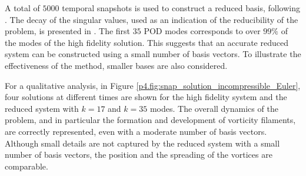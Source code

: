 A total of $5000$ temporal snapshots is used to construct a reduced basis, following . The decay of the singular values, used as an indication of the reducibility of the problem, is presented in . The first $35$ POD modes corresponds to over $99\%$ of the modes of the high fidelity solution. This suggests that an accurate reduced system can be constructed using a small number of basis vectors. To illustrate the effectiveness of the method, smaller bases are also considered.

For a qualitative analysis, in Figure \ref{p4.fig:snap_solution_incompressible_Euler}, four solutions at different times are shown for the high fidelity system and the reduced system with $k=17$ and $k=35$ modes. The overall dynamics of the problem, and in particular the formation and development of vorticity filaments, are correctly represented, even with a moderate number of basis vectors. Although small details are not captured by the reduced system with a small number of basis vectors, the position and the spreading of the vortices are comparable.

